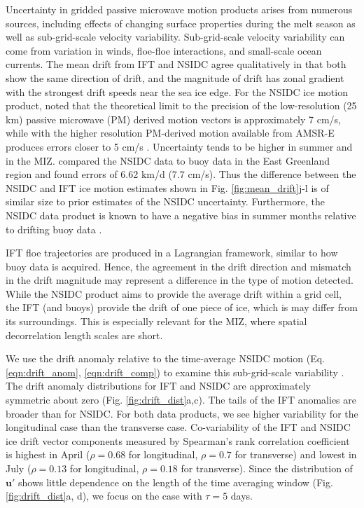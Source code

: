 \documentclass[review, jog]{igs}
\begin{document}
Uncertainty in gridded passive microwave motion products arises from numerous sources, including effects of changing surface properties during the melt season as well as sub-grid-scale velocity variability.
Sub-grid-scale velocity variability can come from variation in winds, floe-floe interactions, and small-scale ocean currents.
The mean drift from IFT and NSIDC agree qualitatively in that both show the same direction of drift, and the magnitude of drift has zonal gradient with the strongest drift speeds near the sea ice edge.
For the NSIDC ice motion product, \cite{tschudi2020_EnhancementSea} noted that the theoretical limit to the precision of the low-resolution (25 km) passive microwave (PM) derived motion vectors is approximately 7 cm/s, while with the higher resolution PM-derived motion available from AMSR-E produces errors closer to 5 cm/s \citep{meier2006_HighresolutionSeaice}. Uncertainty tends to be higher in summer and in the MIZ. \cite{wang2022_IntercomparisonSatellite} compared the NSIDC data to buoy data in the East Greenland region and found errors of 6.62 km/d (7.7 cm/s). Thus the difference between the NSIDC and IFT ice motion estimates shown in Fig. \ref{fig:mean_drift}j-l is of similar size to prior estimates of the NSIDC uncertainty.
Furthermore, the NSIDC data product is known to have a negative bias in summer months relative to drifting buoy data \citep{sumata2014_IntercomparisonArctic}.

IFT floe trajectories are produced in a Lagrangian framework, similar to how buoy data is acquired. 
Hence, the agreement in the drift direction and mismatch in the drift magnitude may represent a difference in the type of motion detected.
While the NSIDC product aims to provide the average drift within a grid cell, the IFT (and buoys) provide the drift of one piece of ice, which is may differ from its surroundings.
This is especially relevant for the MIZ, where spatial decorrelation length scales are short.

We use the drift anomaly relative to the time-average NSIDC motion (Eq. \ref{eqn:drift_anom}, \ref{eqn:drift_comp}) to examine this sub-grid-scale variability . 
The drift anomaly distributions for IFT and NSIDC are approximately symmetric about zero (Fig. \ref{fig:drift_dist}a,c).
The tails of the IFT anomalies are broader than for NSIDC. 
For both data products, we see higher variability for the longitudinal case than the transverse case.
Co-variability of the IFT and NSIDC ice drift vector components  measured by Spearman's rank correlation coefficient is highest in April ($\rho=0.68$ for longitudinal, $\rho=0.7$ for transverse) and lowest in July ($\rho=0.13$ for longitudinal, $\rho=0.18$ for transverse). 
Since the distribution of $\mathbf{u}'$ shows little dependence on the length of the time averaging window (Fig. \ref{fig:drift_dist}a, d), we focus on the case with $\tau=5$ days. 
\end{document}
